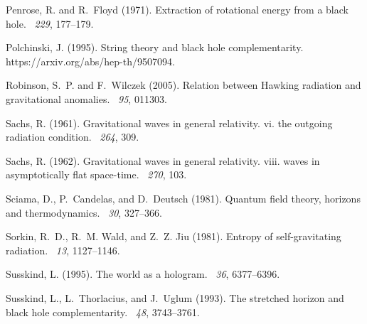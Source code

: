 \documentclass[12pt]{article}
\begin{document}
\begin{thebibliography}{}
Penrose, R. and R.~Floyd (1971).
\newblock Extraction of rotational energy from a black hole.
~{\em 229}, 177--179.

Polchinski, J. (1995).
\newblock String theory and black hole complementarity.
\newblock https://arxiv.org/abs/hep-th/9507094.

Robinson, S.~P. and F.~Wilczek (2005).
\newblock Relation between {H}awking radiation and gravitational anomalies.
~{\em 95}, 011303.

Sachs, R. (1961).
\newblock Gravitational waves in general relativity. vi. the outgoing radiation
  condition.
~{\em 264}, 309.

Sachs, R. (1962).
\newblock Gravitational waves in general relativity. viii. waves in
  asymptotically flat space-time.
~{\em 270}, 103.

Sciama, D., P.~Candelas, and D.~Deutsch (1981).
\newblock Quantum field theory, horizons and thermodynamics.
~{\em 30}, 327--366.

Sorkin, R.~D., R.~M. Wald, and Z.~Z. Jiu (1981).
\newblock Entropy of self-gravitating radiation.
~{\em 13}, 1127--1146.

Susskind, L. (1995).
\newblock The world as a hologram.
~{\em 36}, 6377--6396.

Susskind, L., L.~Thorlacius, and J.~Uglum (1993).
\newblock The stretched horizon and black hole complementarity.
~{\em 48}, 3743--3761.


\end{thebibliography}
\end{document}
